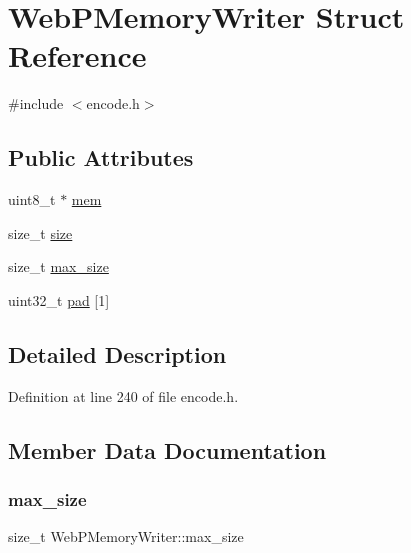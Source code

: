 \hypertarget{struct_web_p_memory_writer}{}\section{Web\+P\+Memory\+Writer Struct Reference}
\label{struct_web_p_memory_writer}


{\ttfamily \#include $<$encode.\+h$>$}

\subsection*{Public Attributes}
\begin{DoxyCompactItemize}
\item 
uint8\+\_\+t $\ast$ \mbox{\hyperlink{struct_web_p_memory_writer_a8360c6b4913e19773104692a76e9bcf4}{mem}}
\item 
size\+\_\+t \mbox{\hyperlink{struct_web_p_memory_writer_abb6a286f7321da4b4abfbb7fa47945c3}{size}}
\item 
size\+\_\+t \mbox{\hyperlink{struct_web_p_memory_writer_a3276b78b5585ae6196f84477b9c5b25f}{max\+\_\+size}}
\item 
uint32\+\_\+t \mbox{\hyperlink{struct_web_p_memory_writer_ae52a301440ed64ef97db833f0f5083d2}{pad}} \mbox{[}1\mbox{]}
\end{DoxyCompactItemize}


\subsection{Detailed Description}


Definition at line 240 of file encode.\+h.



\subsection{Member Data Documentation}
\mbox{\label{struct_web_p_memory_writer_a3276b78b5585ae6196f84477b9c5b25f}} 
\subsubsection{\texorpdfstring{max\_size}{max\_size}}
{\footnotesize\ttfamily size\+\_\+t Web\+P\+Memory\+Writer\+::max\+\_\+size}



